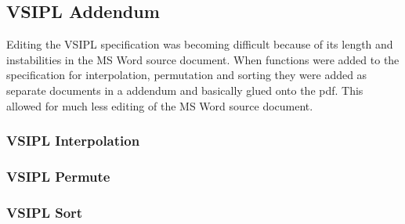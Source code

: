 \subsection*{VSIPL Addendum}
Editing the VSIPL specification was becoming difficult because of its length and instabilities in the MS Word source document. When functions were added to the specification for interpolation, permutation and sorting they were added as separate documents in a addendum and basically glued onto the pdf. This allowed for much less editing of the MS Word source document.
\subsubsection*{VSIPL Interpolation}
\subsubsection*{VSIPL Permute}
\subsubsection*{VSIPL Sort}
